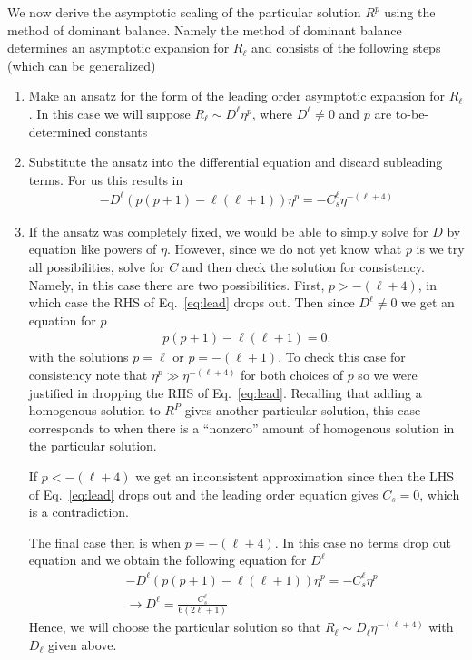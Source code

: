 \documentclass[aps,prd,amsmath,showpacs,amssymb,superscriptaddress,nofootinbib,longbibliography,eqsecnum,preprintnumbers]{revtex4-1}
\begin{document}
We now derive the asymptotic scaling of the particular solution $R^p$ using the method of dominant balance. Namely the method of dominant balance determines an asymptotic expansion for $R_\ell$ and consists of the following steps (which can be generalized)
\begin{enumerate}
\item Make an ansatz for the form of the leading order asymptotic expansion for $R_\ell$. In this case we will suppose $R_\ell \sim D^\ell \eta^p$, where $D^\ell\neq 0$ and $p$ are to-be-determined constants
\item Substitute the ansatz into the differential equation and discard subleading terms. For us this results in
\begin{align}
-D^\ell\left(p(p+1)-\ell(\ell+1)\right)\eta^p=-C^\ell_s \eta^{-(\ell+4)} \label{eq:lead}
\end{align}
\item If the ansatz was completely fixed, we would be able to simply solve for $D$ by equation like powers of $\eta$. However, since we do not yet know what $p$ is we try all possibilities, solve for $C$ and then check the solution for consistency. Namely, in this case there are two possibilities. First, $p> -(\ell+4)$, in which case the RHS of Eq.~\eqref{eq:lead} drops out. Then since $D^\ell \neq 0$ we get an equation for $p$
\begin{align}
p(p+1)-\ell(\ell+1)=0.
\end{align}
with the solutions $p= \ell$ or $p=-(\ell +1)$. To check this case for consistency note that $\eta^p\gg \eta^{-(\ell +4)}$ for both choices of $p$ so we were justified in dropping the RHS of Eq.~\eqref{eq:lead}. Recalling that adding a homogenous solution to $R^P$ gives another particular solution, this case corresponds to when there is a ``nonzero'' amount of homogenous solution in the particular solution.

If $p< -(\ell+4)$ we get an inconsistent approximation since then the LHS of  Eq.~\eqref{eq:lead} drops out and the leading order equation gives $C_s=0$, which is a contradiction. 

The final case then is when $p=-(\ell+4)$. In this case no terms drop out equation and we obtain the following equation for $D^\ell$
\begin{align}
&-D^\ell\left(p(p+1)-\ell(\ell+1)\right)\eta^p=-C^\ell_s \eta^p \nonumber \\
&\to D^\ell =\frac{C_s^\ell}{6(2\ell +1)}
\end{align}
Hence, we will choose the particular solution so that $R_{\ell} \sim D_{\ell}\eta^{-(\ell+4)}$ with $D_{\ell}$ given above.
\end{enumerate}
\end{document}
